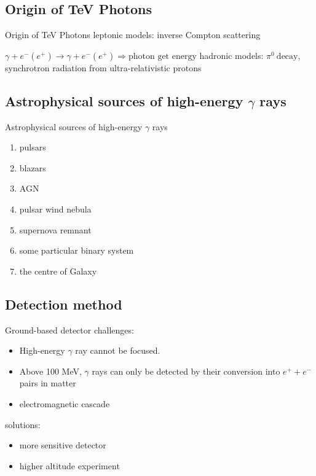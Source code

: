 \documentclass{beamer}
\begin{document}
\subsection{Origin of TeV Photons}
\begin{frame}{Origin of TeV Photons}
	leptonic models: inverse Compton scattering

	$\gamma + e^-(e^+) \rightarrow \gamma + e^-(e^+) \Rightarrow \text{photon get energy} $
	\newline
	\newline
	hadronic models: $\pi^0 \ \text{decay}$, synchrotron radiation from ultra-relativistic protons
\end{frame}


\subsection{Astrophysical sources of high-energy $\gamma$ rays}
\begin{frame}{Astrophysical sources of high-energy $\gamma$ rays}
	\begin{enumerate}
		\item pulsars
		\item blazars
		\item AGN
		\item pulsar wind nebula
		\item supernova remnant
		\item some particular binary system
		\item the centre of Galaxy
	\end{enumerate}
\end{frame}


\subsection{Detection method}
\begin{frame}{Ground-based detector}
	challenges:
	\begin{itemize}
		\item High-energy $\gamma$ ray cannot be focused.
		\item Above 100 MeV, $\gamma$ rays can only be detected by their conversion into $e^+ + e^-$ pairs in matter
		\item electromagnetic cascade
	\end{itemize}

	solutions:
	\begin{itemize}
		\item more sensitive detector
		\item higher altitude experiment
	\end{itemize}
\end{frame}
\end{document}
